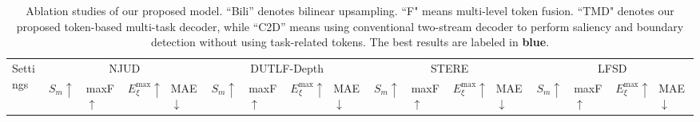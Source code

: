 \documentclass[10pt,twocolumn,letterpaper]{article}
\def\blu#1{\textbf{\color{blue} #1}} \def\red#1{\textbf{\color{red}\underline{#1}}}
\begin{document}
\begin{table*}[t]
\centering
\scriptsize
\renewcommand{\arraystretch}{1.0}
\renewcommand{\tabcolsep}{1.0mm}
\caption{Ablation studies of our proposed model. ``Bili'' denotes bilinear upsampling. ``F" means multi-level token fusion. ``TMD" denotes our proposed token-based multi-task decoder, while ``C2D'' means using conventional two-stream decoder to perform saliency and boundary detection without using task-related tokens. The best results are labeled in \blu{blue}.
}
\begin{tabular}{l|l|cccc|cccc|cccc|cccc}
\hline
\multicolumn{2}{l|}{\multirow{2}{*}{Settings}} & \multicolumn{4}{c|}{NJUD \cite{ju2014njud}} & \multicolumn{4}{c|}{DUTLF-Depth \cite{Piao2019dmra}} & \multicolumn{4}{c|}{STERE \cite{niu2012stere}} & \multicolumn{4}{c}{LFSD \cite{li2014lfsd}}\\
\multicolumn{2}{l|}{} & \multicolumn{1}{l}{$S_m \uparrow$} & \multicolumn{1}{l}{maxF $\uparrow$} & \multicolumn{1}{l}{$E_{\xi}^{\text{max}} \uparrow$} & \multicolumn{1}{l|}{MAE $\downarrow$}
                      & \multicolumn{1}{l}{$S_m \uparrow$} & \multicolumn{1}{l}{maxF $\uparrow$} & \multicolumn{1}{l}{$E_{\xi}^{\text{max}} \uparrow$} & \multicolumn{1}{l|}{MAE $\downarrow$}
                      & \multicolumn{1}{l}{$S_m \uparrow$} & \multicolumn{1}{l}{maxF $\uparrow$} & \multicolumn{1}{l}{$E_{\xi}^{\text{max}} \uparrow$} & \multicolumn{1}{l|}{MAE $\downarrow$}
                      & \multicolumn{1}{l}{$S_m \uparrow$} & \multicolumn{1}{l}{maxF $\uparrow$} & \multicolumn{1}{l}{$E_{\xi}^{\text{max}} \uparrow$} & \multicolumn{1}{l}{MAE $\downarrow$}
  \\ \hline


\end{tabular}
\end{table*}
\end{document}
